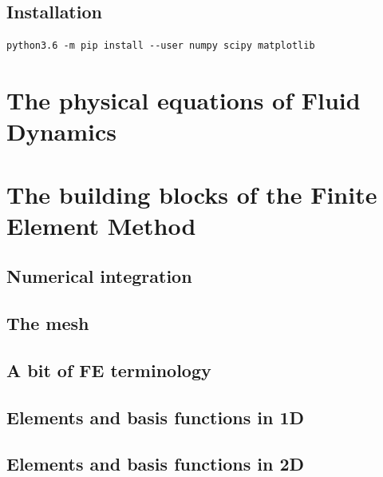 \documentclass[a4paper]{article}
\begin{document}
\subsection{Installation}

\begin{verbatim}
python3.6 -m pip install --user numpy scipy matplotlib
\end{verbatim}

\newpage
\section{The physical equations of Fluid Dynamics} %


\newpage
\section{The building blocks of the Finite Element Method} %

\subsection{Numerical integration}  %

\subsection{The mesh}

\subsection{A bit of FE terminology}  %

\subsection{Elements and basis functions in 1D}  %

\subsection{Elements and basis functions in 2D}  %

\newpage 
\end{document}
